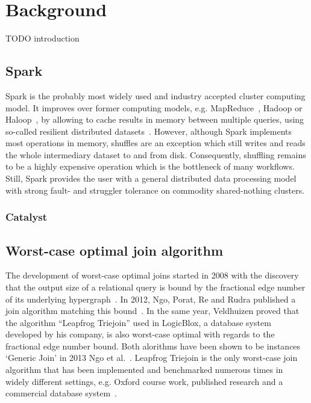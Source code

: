 \section{Background}\label{sec:background}

TODO introduction
\subsection{Spark}
Spark is the probably most widely used and industry accepted cluster computing model.
It improves over former computing models, e.g. MapReduce~\cite{mapreduce}, Hadoop or Haloop~\cite{haloop}, by allowing to cache results in memory between multiple queries, using so-called resilient distributed datasets~\cite{rdd}. %
However, although Spark implements most operations in memory, shuffles are an exception which still writes and reads the whole intermediary dataset to and from disk.
Consequently, shuffling remains to be a highly expensive operation which is the bottleneck of many workflows.
Still, Spark provides the user with a general distributed data processing model with strong fault- and struggler tolerance on commodity shared-nothing clusters.

\subsubsection{Catalyst}

\subsection{Worst-case optimal join algorithm}
The development of worst-case optimal joins started in 2008 with the discovery that the output size of a relational query is bound by the fractional edge number of its underlying hypergraph~\cite{agm}.
In 2012, Ngo, Porat, Re and Rudra published a join algorithm matching this bound~\cite{nprr}.
In the same year, Veldhuizen proved that the algorithm ``Leapfrog Triejoin'' used in LogicBlox, a database system developed by his company, is also worst-case optimal with regards to the
fractional edge number bound.
Both alorithms have been shown to be instances `Generic Join' in 2013 Ngo et al.~\cite{skew-strikes-back}.
Leapfrog Triejoin is the only worst-case join algorithm that has been implemented and benchmarked numerous times in widely different settings, e.g. Oxford course work, published research and a commercial database system~\cite{leapfrog,andreas,olddog,myria,ammar2018distributed,leapfrog-triejoin-schroeder}.

